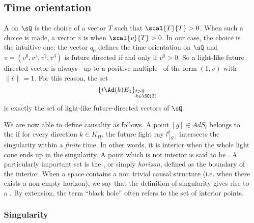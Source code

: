 \subsection{Time orientation}

A  on $\sQ$ is the choice of a vector $T$ such that $\scal{T}{T}>0$. When such a choice is made, a vector $v$ is  when $\scal{v}{T}>0$. In our case, the choice is the intuitive one: the vector $q_0$ defines the time orientation on $\sQ$ and $v=(v^0,v^1,v^2,v^3)$ is future directed if and only if $v^0>0$. So a light-like future directed vector is always --up to a positive multiple-- of the form $(1,\overline{v})$ with $\|\overline{v}\|=1$. For this reason, the set
\begin{equation}	\label{EqTousVecLumTy}
	\{t\Ad(k)E_1\}_{%
	\begin{subarray}{l}
		t>0\\k\in \SO(3)
	\end{subarray}
	}
\end{equation}
is exactly the set of light-like future-directed vectors of $\sQ$.

We are now able to define causality as follows.  A point $[g]\in AdS_l$ belongs to the  if for every direction $k\in K_H$, the future light ray $l^k_{[g]}$ intersects the singularity within a \emph{finite} time.  In other words, it is interior when the whole light cone ends up in the singularity.  A point which is not interior is said to be . A particularly important set is the , or simply \emph{horizon}, defined as the boundary of the interior. When a space contains a non trivial causal structure (i.e. when there exists a non empty horizon), we say that the definition of singularity gives rise to a . By extension, the term ``black hole'' often refers to the set of interior points.

\subsubsection{Singularity}

